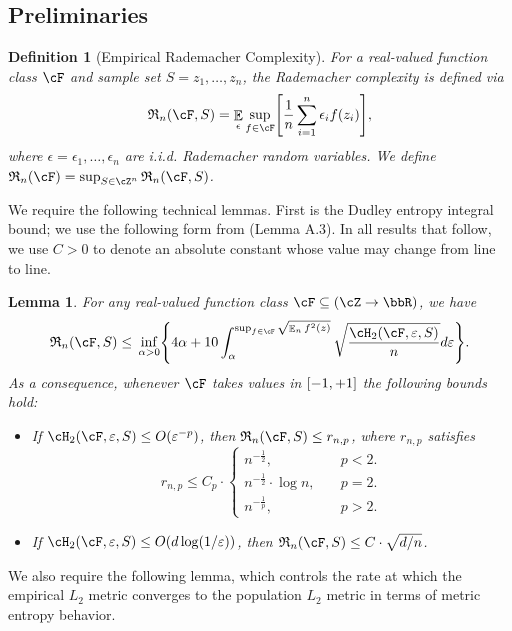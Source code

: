 \documentclass[11pt]{article} %
\theoremstyle{theorem}  %
\newtheorem{lemma}{Lemma}
\theoremstyle{plain}
\newtheorem{definition}{Definition}
\DeclarePairedDelimiter{\brk}{[}{]}
\DeclarePairedDelimiter{\crl}{\{}{\}}
\DeclareMathOperator{\En}{\mathbb{E}}
\newcommand{\eps}{\epsilon}
\newcommand{\veps}{\varepsilon}
\newcommand{\bigoh}{O}
\newcommand{\unitrange}{\brk*{-1,+1}}
\newcommand{\Rad}{\mathfrak{R}_{n}}
\begin{document}
\subsection{Preliminaries}
\begin{definition}[Empirical Rademacher Complexity]
For a real-valued function class $\cF$ and sample set $S=z_1,\ldots,z_n$, the Rademacher complexity is defined via 
\begin{equation}
\Rad(\cF,S) = \En_{\eps}\sup_{f\in\cF}\brk*{\frac{1}{n}\sum_{i=1}^{n}\eps_if(z_i)},
\end{equation}
where $\eps=\eps_1,\ldots,\eps_n$ are i.i.d. Rademacher random variables. We define $\Rad(\cF)=\sup_{S\in\cZ^{n}}\Rad(\cF,S)$.
\end{definition}
We require the following technical lemmas. First is the Dudley entropy integral bound; we use the following form from \cite{srebro2010smoothness} (Lemma A.3). In all results that follow, we use $C>0$ to denote an absolute constant whose value may change from line to line.
\begin{lemma}
\label{lem:dudley}
For any real-valued function class $\cF\subseteq{}(\cZ\to\bbR)$, we have
\begin{equation}
\label{eq:dudley}
\Rad(\cF,S) \leq{} \inf_{\alpha>0}\crl*{
4\alpha + 10\int_{\alpha}^{\sup_{f\in\cF}\sqrt{\En_{n}f^{2}(z)}}
\sqrt{\frac{\cH_2(\cF,\veps,S)}{n}}d\veps
}.
\end{equation}
As a consequence, whenever $\cF$ takes values in $\unitrange$ the following bounds hold:
\begin{itemize}
\item If $\cH_2(\cF,\veps,S)\leq{}\bigoh(\veps^{-p})$, then $\Rad(\cF,S)\leq{}r_{n,p}$, where $r_{n,p}$ satisfies
\[
r_{n,p} \leq{} C_{p}\cdot\left\{\begin{array}{ll}
n^{-\frac{1}{2}},\quad&p<2.\\
n^{-\frac{1}{2}}\cdot\log{}n,\quad&p=2.\\
n^{-\frac{1}{p}},\quad&p>2.
\end{array}\right.
\]
\item If $\cH_2(\cF,\veps,S)\leq{}\bigoh(d\log(1/\veps))$, then $\Rad(\cF,S)\leq{}C\cdot\sqrt{d/n}$.
\end{itemize}
\end{lemma}We also require the following lemma, which controls the rate at which the empirical $L_2$ metric converges to the population $L_2$ metric in terms of metric entropy behavior.
\end{document}
